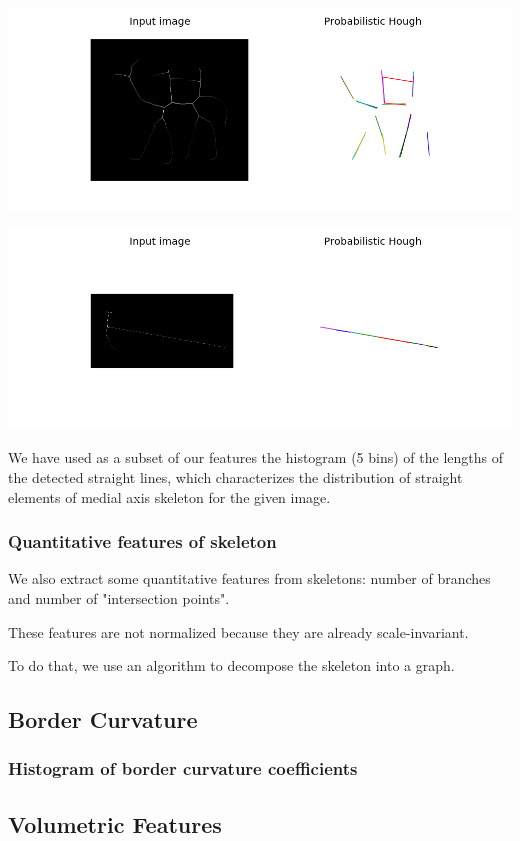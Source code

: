 \documentclass[12pt]{article}
\begin{document}
\includegraphics[scale=0.6]{camel_764.png}
\vspace{12px}

\includegraphics[scale=0.6]{hammer_604.png}

We have used as a subset of our features the histogram (5 bins) of the lengths of the detected straight lines, which characterizes the distribution of straight elements of medial axis skeleton for the given image.

\subsubsection{Quantitative features of skeleton}
We also extract some quantitative features from skeletons: number of branches and number of "intersection points".

These features are not normalized because they are already scale-invariant.

To do that, we use an algorithm to decompose the skeleton into a graph.

\subsection{Border Curvature}
\subsubsection{Histogram of border curvature coefficients}

\subsection{Volumetric Features}
\end{document}
